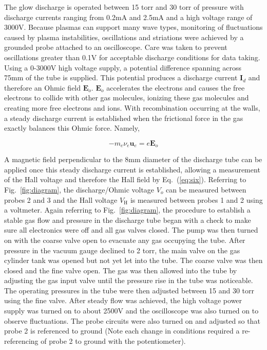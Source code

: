 \documentclass[%
 aip,
rsi,%
 amsmath,amssymb,
 reprint,%
author-numerical,%
]{revtex4-1}
\begin{document}
\indent The glow discharge is operated between 15 torr and 30 torr of pressure with discharge currents ranging from 0.2mA and 2.5mA and a high voltage range of 3000V. Because plasmas can support many wave types\cite{Kunkel}, monitoring of fluctuations caused by plasma instabilities, oscillations and striations were achieved by a grounded probe attached to an oscilloscope. Care was taken to prevent oscillations greater than 0.1V for acceptable discharge conditions for data taking. \newline
\indent Using a 0-3000V high voltage supply, a potential difference spanning across 75mm of the tube is supplied. This potential produces a discharge current $\boldsymbol { I}_{d}$ and therefore an Ohmic field $\boldsymbol { E } _ { o }$. $\boldsymbol { E } _ { o }$ accelerates the electrons and causes the free electrons to collide with other gas molecules, ionizing these gas molecules and creating more free electrons and ions. With recombination occurring at the walls, a steady discharge current is established when the frictional force in the gas exactly balances this Ohmic force. Namely, 

\begin{equation}
- m _ { e } \nu _ { e } \boldsymbol{ u } _ { e } = e \boldsymbol { E }_{o}
\label{eq:seven}
\end{equation}

\indent A magnetic field perpendicular to the 8mm diameter of the discharge tube can be applied once this steady discharge current is established, allowing a measurement of the Hall voltage and therefore the Hall field by Eq.~(\ref{eq:six}). Referring to Fig.~\ref{fig:diagram}, the discharge/Ohmic voltage $  V _ { o }$ can be measured between probes 2 and 3 and the Hall voltage $V _ { \mathrm { H }} $ is measured between probes 1 and 2 using a voltmeter. \newline
\indent Again referring to Fig.~\ref{fig:diagram}, the procedure to establish a stable gas flow and pressure in the discharge tube began with a check to make sure all electronics were off and all gas valves closed. The pump was then turned on with the coarse valve open to evacuate any gas occupying the tube. After pressure in the vacuum gauge declined to 2 torr, the main valve on the gas cylinder tank was opened but not yet let into the tube. The coarse valve was then closed and the fine valve open. The gas was then allowed into the tube by adjusting the gas input valve until the pressure rise in the tube was noticeable. The operating pressures in the tube were then adjusted between 15 and 30 torr using the fine valve. \newline
\indent After steady flow was achieved, the high voltage power supply was turned on to about 2500V and the oscilloscope was also turned on to observe fluctuations. The probe circuits were also turned on and adjusted so that probe 2 is referenced to ground (Note each change in conditions required a re-referencing of probe 2 to ground with the potentiometer).
\end{document}
